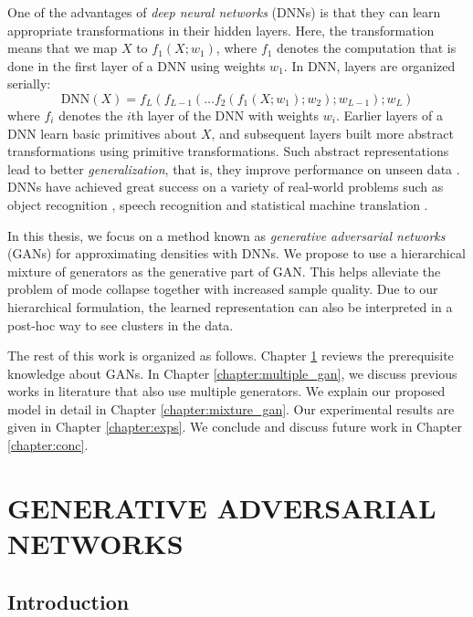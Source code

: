 \documentclass[a4paper,onesided,12pt]{report}
\begin{document}
One of the advantages of \emph{deep neural networks} (DNNs) is that they can learn appropriate transformations in their hidden layers. Here, the transformation means that we map $X$ to $f_1(X; w_1)$, where $f_1$ denotes the computation that is done in the first layer of a DNN using weights $w_1$. In DNN, layers are organized serially:
\begin{equation}
\text{DNN}(X) = f_L (f_{L-1} ( \dots f_2( f_1(X; w_1); w_2); w_{L-1}); w_L)
\label{eq:dnn}
\end{equation}
where $f_i$ denotes the $i$th layer of the DNN with weights $w_i$. Earlier layers of a DNN learn basic primitives about $X$, and subsequent layers built more abstract transformations using primitive transformations. Such abstract representations lead to better \emph{generalization}, that is, they improve performance on unseen data \cite{bengio2009learning}. DNNs have achieved great success on a variety of real-world problems such as object recognition \cite{krizhevsky2012imagenet}, speech recognition \cite{hinton2012deep} and statistical machine translation \cite{sutskever2014sequence}.

In this thesis, we focus on a method known as \emph{generative adversarial networks} (GANs) \cite{goodfellow2014generative} for approximating densities with DNNs. We propose to use a hierarchical mixture of generators as the generative part of GAN. This helps alleviate the problem of mode collapse together with increased sample quality. Due to our hierarchical formulation, the learned representation can also be interpreted in a post-hoc way to see clusters in the data.

The rest of this work is organized as follows. Chapter \ref{chapter:gan} reviews the prerequisite knowledge about GANs. In Chapter \ref{chapter:multiple_gan}, we discuss previous works in literature that also use multiple generators. We explain our proposed model in detail in Chapter \ref{chapter:mixture_gan}. Our experimental results are given in Chapter \ref{chapter:exps}. We conclude and discuss future work in Chapter \ref{chapter:conc}.

\chapter{GENERATIVE ADVERSARIAL NETWORKS}
\label{chapter:gan}

\section{Introduction}
\label{sec:gan:intro}
\end{document}
